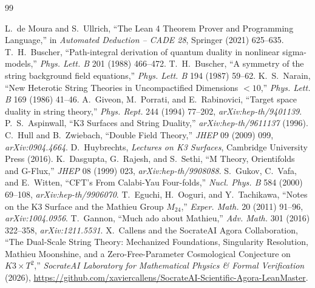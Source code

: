 \documentclass[11pt,a4paper]{article}
\theoremstyle{remark}
\begin{document}
\begin{thebibliography}{99}

 L.~de Moura and S.~Ullrich, ``The Lean 4 Theorem Prover and Programming Language,'' in \textit{Automated Deduction -- CADE 28}, Springer (2021) 625--635.
 T.~H.~Buscher, ``Path-integral derivation of quantum duality in nonlinear sigma-models,'' \textit{Phys. Lett. B} 201 (1988) 466--472.
 T.~H.~Buscher, ``A symmetry of the string background field equations,'' \textit{Phys. Lett. B} 194 (1987) 59--62.
 K.~S.~Narain, ``New Heterotic String Theories in Uncompactified Dimensions $<10$,'' \textit{Phys. Lett. B} 169 (1986) 41--46.
 A.~Giveon, M.~Porrati, and E.~Rabinovici, ``Target space duality in string theory,'' \textit{Phys. Rept.} 244 (1994) 77--202, \textit{arXiv:hep-th/9401139}.
 P.~S.~Aspinwall, ``K3 Surfaces and String Duality,'' \textit{arXiv:hep-th/9611137} (1996).
 C.~Hull and B.~Zwiebach, ``Double Field Theory,'' \textit{JHEP} 09 (2009) 099, \textit{arXiv:0904.4664}.
 D.~Huybrechts, \textit{Lectures on K3 Surfaces}, Cambridge University Press (2016).
 K.~Dasgupta, G.~Rajesh, and S.~Sethi, ``M Theory, Orientifolds and G-Flux,'' \textit{JHEP} 08 (1999) 023, \textit{arXiv:hep-th/9908088}.
 S.~Gukov, C.~Vafa, and E.~Witten, ``CFT's From Calabi-Yau Four-folds,'' \textit{Nucl. Phys. B} 584 (2000) 69--108, \textit{arXiv:hep-th/9906070}.
 T.~Eguchi, H.~Ooguri, and Y.~Tachikawa, ``Notes on the K3 Surface and the Mathieu Group $M_{24}$,'' \textit{Exper. Math.} 20 (2011) 91--96, \textit{arXiv:1004.0956}.
 T.~Gannon, ``Much ado about Mathieu,'' \textit{Adv. Math.} 301 (2016) 322--358, \textit{arXiv:1211.5531}.
 X.~Callens and the SocrateAI Agora Collaboration, ``The Dual-Scale String Theory: Mechanized Foundations, Singularity Resolution, Mathieu Moonshine, and a Zero-Free-Parameter Cosmological Conjecture on $K3\times T^2$,'' \textit{SocrateAI Laboratory for Mathematical Physics \& Formal Verification} (2026), \url{https://github.com/xaviercallens/SocrateAI-Scientific-Agora-LeanMaster}.

\end{thebibliography}
\end{document}
